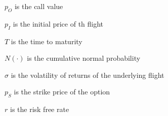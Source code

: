 \begin{compactdesc}
\item[$p_O$] is the call value
\item[$p_I$] is the initial price of th flight
\item[$T$] is the time to maturity
\item[$N(\cdot)$] is the cumulative normal probability
\item[$\sigma$] is the volatility of returns of the underlying flight
\item[$p_S$] is the strike price of the option
\item[$r$] is the risk free rate
\vspace{1ex}
\end{compactdesc}